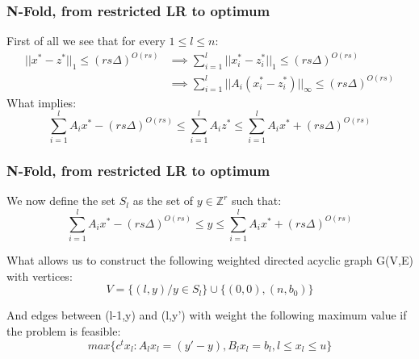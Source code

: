 \documentclass{beamer}
\begin{document}
    \begin{frame}
        \frametitle{N-Fold, from restricted LR to optimum}
        First of all we see that for every $1 \leq l \leq n$:
        \begin{align*}
            ||x^* - z^*||_1 \leq (rs\Delta)^{O(rs)} 
            & \implies \sum_{i=1}^l ||x_i^* - z_i^*||_1 \leq (rs\Delta)^{O(rs)}\\ 
            & \implies \sum_{i=1}^l ||A_i(x_i^* - z_i^*)||_\infty \leq (rs\Delta)^{O(rs)}
        \end{align*}
        What implies:
        \begin{equation*}
            \sum_{i=1}^l A_ix^* - (rs\Delta)^{O(rs)} \leq \sum_{i=1}^l A_iz^* \leq \sum_{i=1}^l A_ix^* + (rs\Delta)^{O(rs)} 
        \end{equation*}
        
    \end{frame}
    \begin{frame}
        \frametitle{N-Fold, from restricted LR to optimum}
        We now define the set $S_l$ as the set of $y \in \mathbb{Z}^r$ such that:
        \begin{equation*}
        \sum_{i=1}^l A_ix^* - (rs\Delta)^{O(rs)} \leq y \leq \sum_{i=1}^l A_ix^* + (rs\Delta)^{O(rs)} 
        \end{equation*}
        
        
        What allows us to construct the following weighted directed acyclic graph G(V,E) with vertices:
        \begin{equation*}
            V = \{(l,y) / y \in S_l\} \cup \{ (0,0), (n,b_0) \}
        \end{equation*}
        
        And edges between (l-1,y) and (l,y') with weight the following maximum value if the problem is feasible:
        \begin{equation*}
            max\{c^tx_l: A_lx_l = (y'-y), B_lx_l = b_l, l \leq x_l \leq u \}
        \end{equation*}
        
    \end{frame}
\end{document}

